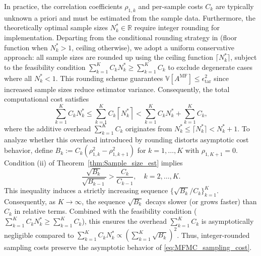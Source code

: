 In practice, the correlation coefficients $\rho_{1,k}$ and per-sample costs $C_k$ are typically unknown a priori and must be estimated from the sample data. Furthermore, the theoretically optimal sample sizes $N_k^* \in \mathbb{R}$ require integer rounding for implementation. Departing from the conditional rounding strategy in \cite{GrGuJuWa:2023, PeWiGu:2016} (floor function when $N_k^* > 1$, ceiling otherwise), we adopt a uniform conservative approach: all sample sizes are rounded up using the ceiling function $\lceil N_k^* \rceil$,  subject to the feasibility condition $\sum_{k=1}^K C_k N_k^* \geq \sum_{k=1}^K C_k$ to exclude degenerate cases where all $N_k^* < 1$. This rounding scheme guarantees $\mathbb{V}[A^{\mathrm{MF}}] \leq \epsilon_{\mathrm{tar}}^2$ since increased sample sizes reduce estimator variance. Consequently, the total computational cost satisfies
%
\begin{equation}\label{eq:sampling_cost_bound}
    \sum_{k=1}^K C_k N_k^*\le \sum_{k=1}^K C_k \left\lceil N_k^*\right\rceil<\sum_{k=1}^K C_k N_k^* + \sum_{k=1}^K C_k,
\end{equation}
%
where the additive overhead $\sum_{k=1}^K C_k$ originates from $N_k^*\le \lceil N_k^*\rceil< N_k^*+1$. To analyze whether this overhead introduced by rounding distorts asymptotic cost behavior, define $B_k := C_k(\rho_{1,k}^2 - \rho_{1,k+1}^2)$ for $k=1,\dots,K$ with $\rho_{1,K+1} = 0$. Condition (ii) of Theorem~\ref{thm:Sample_size_est} implies
%
%
\begin{equation}
\label{eq:Bk_Ck_decay_rate}
    \frac{\sqrt{B_{k}}}{\sqrt{B_{k-1}}}>\frac{C_{k}}{C_{k-1}}, \quad k=2,\ldots,K.
\end{equation}
%
This inequality induces a strictly increasing sequence $\{\sqrt{B_k}/C_k\}_{k=1}^K$. Consequently, as $K \to \infty$, the sequence $\sqrt{B_k}$ decays slower (or grows faster) than $C_k$ in relative terms. Combined with the feasibility condition ($\sum_{k=1}^K C_kN_k^*\ge \sum_{k=1}^K C_k$), this ensures the overhead $\sum_{k=1}^K C_k$ is asymptotically negligible compared to $\sum_{k=1}^K C_k N_k^* \propto \left( \sum_{k=1}^K \sqrt{B_k} \right)^2$. Thus, integer-rounded sampling costs preserve the asymptotic behavior of \eqref{eq:MFMC_sampling_cost}.


